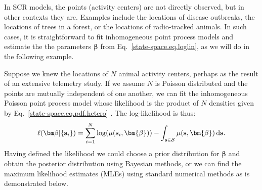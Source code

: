 In SCR models, the points (activity centers) are not directly
observed, but in other contexts they are. Examples include the
locations of disease outbreaks, the locations of trees in a forest, or
the locations of radio-tracked animals. In such cases, it is
straightforward to fit inhomogeneous point process models and estimate the
the parameters $\bm \beta$ from Eq.~\ref{state-space.eq.loglin}, as we
will do in the following example. %

Suppose we knew the locations of $N$ animal activity
centers, perhaps as the result of an extensive telemetry study. %
If we assume $N$ is Poisson distributed and the points are
mutually independent of one another, we can fit the
inhomogeneous Poisson point process model whose likelihood is
the product of $N$ densities given by
Eq.~\ref{state-space.eq.pdf.hetero} \citep[pg. 104]{diggle:2003}. The
log-likelihood is thus:
\[
\ell({\bm \beta} | \{{\bf s}_i\}) = \sum_{i=1}^N
\log(\mu(\mathbf{s}_i, \bm{\beta})) - \int_{\mathbf{s} \in
  \mathcal{S}} \mu(\mathbf{s}, \bm{\beta}) \, \mathrm{d} \mathbf{s} .
\]
Having defined the likelihood we could choose a prior distribution for
$\bm \beta$ and obtain the posterior distribution %
using Bayesian methods, or we can find the maximum likelihood
estimates (MLEs) using standard numerical methods as is demonstrated
below.

